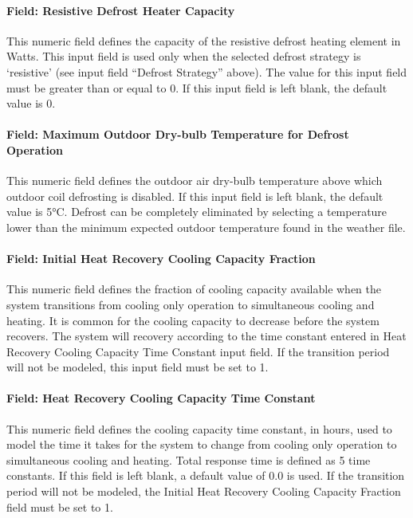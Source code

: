 \paragraph{Field: Resistive Defrost Heater Capacity}

This numeric field defines the capacity of the resistive defrost heating element in Watts. This input field is used only when the selected defrost strategy is `resistive' (see input field ``Defrost Strategy'' above). The value for this input field must be greater than or equal to 0. If this input field is left blank, the default value is 0.

\paragraph{Field: Maximum Outdoor Dry-bulb Temperature for Defrost Operation}

This numeric field defines the outdoor air dry-bulb temperature above which outdoor coil defrosting is disabled. If this input field is left blank, the default value is 5°C. Defrost can be completely eliminated by selecting a temperature lower than the minimum expected outdoor temperature found in the weather file.


\paragraph{Field: Initial Heat Recovery Cooling Capacity Fraction}

This numeric field defines the fraction of cooling capacity available when the system transitions from cooling only operation to simultaneous cooling and heating. It is common for the cooling capacity to decrease before the system recovers. The system will recovery according to the time constant entered in Heat Recovery Cooling Capacity Time Constant input field. If the transition period will not be modeled, this input field must be set to 1.

\paragraph{Field: Heat Recovery Cooling Capacity Time Constant}

This numeric field defines the cooling capacity time constant, in hours, used to model the time it takes for the system to change from cooling only operation to simultaneous cooling and heating. Total response time is defined as 5 time constants. If this field is left blank, a default value of 0.0 is used. If the transition period will not be modeled, the Initial Heat Recovery Cooling Capacity Fraction field must be set to 1.

